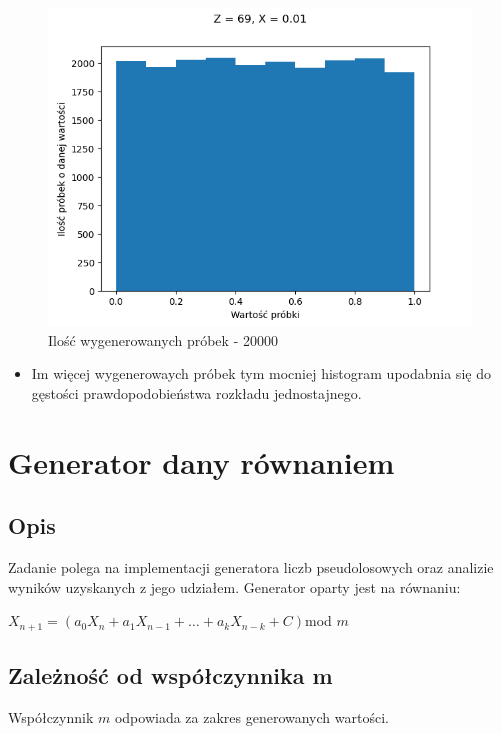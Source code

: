 \documentclass[12pt,a4paper]{article}
\begin{document}
  \begin{figure}[H]
    \centering
    \includegraphics[height=0.25\textheight]{figures/Figure_13.png}
    \caption{Ilość wygenerowanych próbek - 20000}
    \label{fig:13}
  \end{figure}

  \begin{itemize}
    \item Im więcej wygenerowaych próbek tym mocniej histogram upodabnia się do gęstości prawdopodobieństwa rozkładu jednostajnego.  
  \end{itemize}

\section{Generator dany równaniem}

\subsection{Opis}
Zadanie polega na implementacji generatora liczb pseudolosowych oraz analizie wyników uzyskanych z jego udziałem. Generator oparty jest na równaniu: 

$X_{n+1}=(a_0X_{n} + a_1X_{n-1} + \ldots + a_{k}X_{n-k} + C)$mod $m$


\subsection{Zależność od współczynnika m}
Współczynnik $m$ odpowiada za zakres generowanych wartości.
\end{document}
